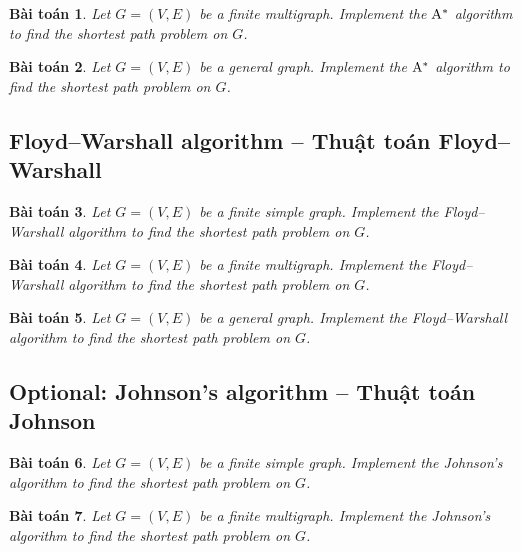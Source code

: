 \documentclass{article}
\newtheorem{baitoan}{Bài toán}
\begin{document}
\begin{baitoan}
    Let $G = (V,E)$ be a finite multigraph. Implement the $\rm A^*$ algorithm to find the shortest path problem on $G$.
\end{baitoan}

\begin{baitoan}
    Let $G = (V,E)$ be a general graph. Implement the $\rm A^*$ algorithm to find the shortest path problem on $G$.
\end{baitoan}


\subsection{Floyd--Warshall algorithm -- Thuật toán Floyd--Warshall}

\begin{baitoan}
    Let $G = (V,E)$ be a finite simple graph. Implement the Floyd--Warshall algorithm to find the shortest path problem on $G$.
\end{baitoan}

\begin{baitoan}
    Let $G = (V,E)$ be a finite multigraph. Implement the Floyd--Warshall algorithm to find the shortest path problem on $G$.
\end{baitoan}

\begin{baitoan}
    Let $G = (V,E)$ be a general graph. Implement the Floyd--Warshall algorithm to find the shortest path problem on $G$.
\end{baitoan}


\subsection{Optional: Johnson's algorithm -- Thuật toán Johnson}

\begin{baitoan}
    Let $G = (V,E)$ be a finite simple graph. Implement the Johnson's algorithm to find the shortest path problem on $G$.
\end{baitoan}

\begin{baitoan}
    Let $G = (V,E)$ be a finite multigraph. Implement the Johnson's algorithm to find the shortest path problem on $G$.
\end{baitoan}
\end{document}

